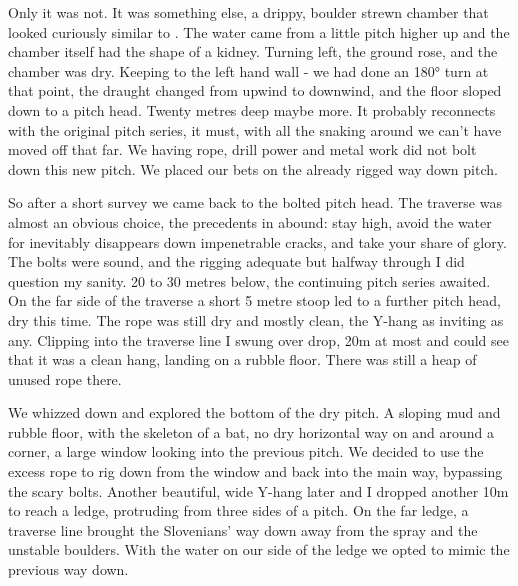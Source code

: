 Only it was not. It was something else, a drippy, boulder strewn chamber that looked curiously similar to . The water came from a little pitch higher up and the chamber itself had the shape of a kidney. Turning left, the ground rose, and the chamber was dry. Keeping to the left hand wall - we had done an 180° turn at that point, the draught changed from upwind to downwind, and the floor sloped down to a pitch head. Twenty metres deep maybe more. It probably reconnects with the original pitch series, it must, with all the snaking around we can't have moved off that far. We having rope, drill power and metal work did not bolt down this new pitch. We placed our bets on the already rigged way down  pitch. 

So after a short survey we came back to the bolted pitch head. The traverse was almost an obvious choice, the precedents in  abound: stay high, avoid the water for inevitably disappears down impenetrable cracks, and take your share of glory. The bolts were sound, and the rigging adequate but halfway through I did question my sanity. 20 to 30 metres below, the continuing pitch series awaited. On the far side of the traverse a short 5 metre stoop led to a further pitch head, dry this time. The rope was still dry and mostly clean, the Y-hang as inviting as any. Clipping into the traverse line I swung over drop, 20m at most and could see that it was a clean hang, landing on a rubble floor. There was still a heap of unused rope there. 

We whizzed down and explored the bottom of the dry pitch. A sloping mud and rubble floor, with the skeleton of a bat, no dry horizontal way on and around a corner, a large window looking into the previous pitch. We decided to use the excess rope to rig down from the window and back into the main way, bypassing the scary bolts. Another beautiful, wide Y-hang later and I dropped another 10m to reach a ledge, protruding from three sides of a pitch. On the far ledge, a traverse line brought the Slovenians' way down away from the spray and the unstable boulders. With the water on our side of the ledge we opted to mimic the previous way down. 

